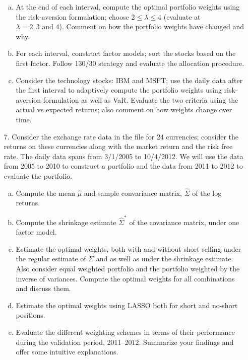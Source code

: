 \begin{enumerate}
    \begin{enumerate}[(a)]
    \item At the end of each interval, compute the optimal portfolio weights using the risk-aversion
formulation; choose $2 \leq \lambda \leq 4$ (evaluate at $\lambda = 2, 3 \text{ and } 4$). Comment on how the
portfolio weights have changed and why.
    \item For each interval, construct factor models; sort the stocks based on the first factor. Follow 130/30 strategy and evaluate the allocation procedure.
    \item Consider the technology stocks: IBM and MSFT; use the daily data after the first
interval to adaptively compute the portfolio weights using risk-aversion formulation as
well as VaR. Evaluate the two criteria using the actual vs expected returns; also comment
on how weights change over time.
    \end{enumerate}
    
    


\item[7.] Consider the exchange rate data in the file  for 24 currencies; consider the returns on these currencies along with the market return and the risk free rate. The daily data spans from 3/1/2005 to 10/4/2012. We will use the data from 2005 to 2010 to construct a portfolio and the data from 2011 to 2012 to evaluate the portfolio.
	\begin{enumerate}[(a)]
	\item Compute the mean $\hat{\mu}$ and sample convariance matrix, $\hat{\Sigma}$ of the log returns.
	\item Compute the shrinkage estimate $\hat{\Sigma}^*$ of the covariance matrix, under one factor model.
	\item Estimate the optimal weights, both with and without short selling under the regular estimate of $\Sigma$ and as well as under the shrinkage estimate. Also consider equal weighted portfolio and the portfolio weighted by the inverse of variances. Compute the optimal weights for all combinations and discuss them.
	\item Estimate the optimal weights using LASSO both for short and no-short positions.
	\item Evaluate the different weighting schemes in terms of their performance during the validation period, 2011--2012. Summarize your findings and offer some intuitive explanations.
	\end{enumerate}
    

\end{enumerate}

